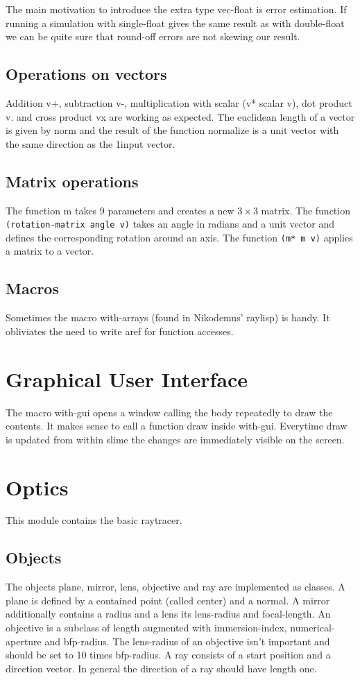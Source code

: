 \documentclass[twocolumn,DIV20]{scrartcl}
\begin{document}
The main motivation to introduce the extra type vec-float is error
estimation. If running a simulation with single-float gives the same
result as with double-float we can be quite sure that round-off errors
are not skewing our result.

\subsection{Operations on vectors}
Addition v+, subtraction v-, multiplication with scalar (v* scalar v),
dot product v. and cross product vx are working as expected. The
euclidean length of a vector is given by norm and the result of the
function normalize is a unit vector with the same direction as the
1input vector.

\subsection{Matrix operations}
The function m takes 9 parameters and creates a new $3\times3$
matrix. The function \verb!(rotation-matrix angle v)! takes an angle
in radians and a unit vector and defines the corresponding rotation
around an axis. The function \verb!(m* m v)! applies a matrix to a
vector.

\subsection{Macros}
Sometimes the macro with-arrays (found in Nikodemus' raylisp) is
handy. It obliviates the need to write aref for function accesses.

\section{Graphical User Interface}
The macro with-gui opens a window calling the body repeatedly to draw
the contents. It makes sense to call a function draw inside
with-gui. Everytime draw is updated from within slime the changes are
immediately visible on the screen.

\section{Optics}
This module contains the basic raytracer.
\subsection{Objects}
The objects plane, mirror, lens, objective and ray are implemented as
classes. A plane is defined by a contained point (called center) and a
normal. A mirror additionally contains a radius and a lens its
lens-radius and focal-length. An objective is a subclass of length
augmented with immersion-index, numerical-aperture and bfp-radius. The
lens-radius of an objective isn't important and should be set to 10
times bfp-radius. A ray consists of a start position and a direction
vector. In general the direction of a ray should have length one.
\end{document}
